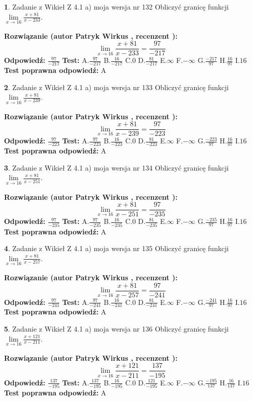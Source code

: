 \documentclass[12pt, a4paper]{article}
\theoremstyle{definition} %
\newtheorem{zad}{}
\newcommand{\zadStart}[1]{\begin{zad}#1\newline}
\newcommand{\zadStop}{\end{zad}}
\newcommand{\rozwStart}[2]{\noindent \textbf{Rozwiązanie (autor #1 , recenzent #2): }\newline}
\newcommand{\rozwStop}{\newline}
\newcommand{\odpStart}{\noindent \textbf{Odpowiedź:}\newline}
\newcommand{\odpStop}{\newline}
\newcommand{\testStart}{\noindent \textbf{Test:}\newline}
\newcommand{\testStop}{\newline}
\newcommand{\kluczStart}{\noindent \textbf{Test poprawna odpowiedź:}\newline}
\newcommand{\kluczStop}{\newline}
\begin{document}
\zadStart{Zadanie z Wikieł Z 4.1 a) moja wersja nr 132}
Obliczyć granicę funkcji $\lim\limits_{x\to16}\frac{x+81}{x-233}$.
\zadStop
\rozwStart{Patryk Wirkus}{}
$$\lim\limits_{x\to16}\frac{x+81}{x-233} = \frac{97}{-217}$$
\rozwStop
\odpStart
$\frac{97}{-217}$
\odpStop
\testStart
A.$\frac{97}{-217}$
B.$\frac{16}{-217}$
C.$0$
D.$\frac{81}{-217}$
E.$\infty$
F.$-\infty$
G.$\frac{-217}{97}$
H.$\frac{16}{97}$
I.$16$
\testStop
\kluczStart
A
\kluczStop



\zadStart{Zadanie z Wikieł Z 4.1 a) moja wersja nr 133}
Obliczyć granicę funkcji $\lim\limits_{x\to16}\frac{x+81}{x-239}$.
\zadStop
\rozwStart{Patryk Wirkus}{}
$$\lim\limits_{x\to16}\frac{x+81}{x-239} = \frac{97}{-223}$$
\rozwStop
\odpStart
$\frac{97}{-223}$
\odpStop
\testStart
A.$\frac{97}{-223}$
B.$\frac{16}{-223}$
C.$0$
D.$\frac{81}{-223}$
E.$\infty$
F.$-\infty$
G.$\frac{-223}{97}$
H.$\frac{16}{97}$
I.$16$
\testStop
\kluczStart
A
\kluczStop



\zadStart{Zadanie z Wikieł Z 4.1 a) moja wersja nr 134}
Obliczyć granicę funkcji $\lim\limits_{x\to16}\frac{x+81}{x-251}$.
\zadStop
\rozwStart{Patryk Wirkus}{}
$$\lim\limits_{x\to16}\frac{x+81}{x-251} = \frac{97}{-235}$$
\rozwStop
\odpStart
$\frac{97}{-235}$
\odpStop
\testStart
A.$\frac{97}{-235}$
B.$\frac{16}{-235}$
C.$0$
D.$\frac{81}{-235}$
E.$\infty$
F.$-\infty$
G.$\frac{-235}{97}$
H.$\frac{16}{97}$
I.$16$
\testStop
\kluczStart
A
\kluczStop



\zadStart{Zadanie z Wikieł Z 4.1 a) moja wersja nr 135}
Obliczyć granicę funkcji $\lim\limits_{x\to16}\frac{x+81}{x-257}$.
\zadStop
\rozwStart{Patryk Wirkus}{}
$$\lim\limits_{x\to16}\frac{x+81}{x-257} = \frac{97}{-241}$$
\rozwStop
\odpStart
$\frac{97}{-241}$
\odpStop
\testStart
A.$\frac{97}{-241}$
B.$\frac{16}{-241}$
C.$0$
D.$\frac{81}{-241}$
E.$\infty$
F.$-\infty$
G.$\frac{-241}{97}$
H.$\frac{16}{97}$
I.$16$
\testStop
\kluczStart
A
\kluczStop



\zadStart{Zadanie z Wikieł Z 4.1 a) moja wersja nr 136}
Obliczyć granicę funkcji $\lim\limits_{x\to16}\frac{x+121}{x-211}$.
\zadStop
\rozwStart{Patryk Wirkus}{}
$$\lim\limits_{x\to16}\frac{x+121}{x-211} = \frac{137}{-195}$$
\rozwStop
\odpStart
$\frac{137}{-195}$
\odpStop
\testStart
A.$\frac{137}{-195}$
B.$\frac{16}{-195}$
C.$0$
D.$\frac{121}{-195}$
E.$\infty$
F.$-\infty$
G.$\frac{-195}{137}$
H.$\frac{16}{137}$
I.$16$
\testStop
\kluczStart
A
\kluczStop
\end{document}
